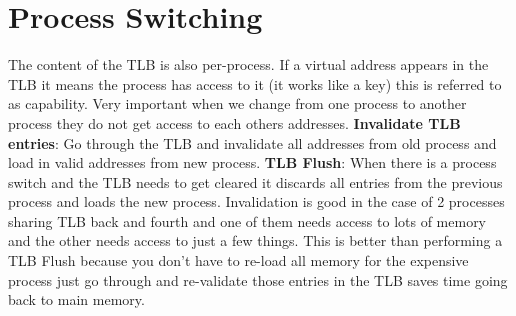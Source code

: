 \documentclass[twoside]{article}
\begin{document}
\section{Process Switching}
The content of the TLB is also per-process. If a virtual address appears in the TLB it means the process has access to it (it works like a key) this is referred to as capability. Very important when we change from one process to another process they do not get access to each others addresses.
\newline
\textbf{Invalidate TLB entries}: Go through the TLB and invalidate all addresses from old process and load in valid addresses from new process. 
\newline
\textbf{TLB Flush}: When there is a process switch and the TLB needs to get cleared it discards all entries from the previous process and loads the new process.
\newline
Invalidation is good in the case of 2 processes sharing TLB back and fourth and one of them needs access to lots of memory and the other needs access to just a few things. This is better than performing a TLB Flush because you don't have to re-load all memory for the expensive process just go through and re-validate those entries in the TLB saves time going back to main memory.  
\end{document}
